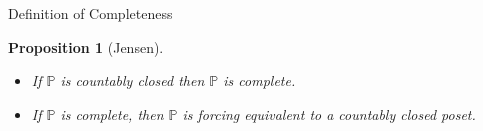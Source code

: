 \documentclass[utf8x,xcolor=svgnames,8pt]{beamer}
\renewcommand{\P}{\mathbb{P}}
\newtheorem{proposition}{Proposition}
\begin{document}
\begin{frame}{Definition of Completeness}
\begin{proposition}[Jensen] \begin{itemize}
	\item If $\P$ is countably closed then $\P$ is complete.
%
	\item If $\P$ is complete, then $\P$ is forcing equivalent to a countably closed poset. 
	\end{itemize}
	\end{proposition}

\end{frame}
\end{document}
